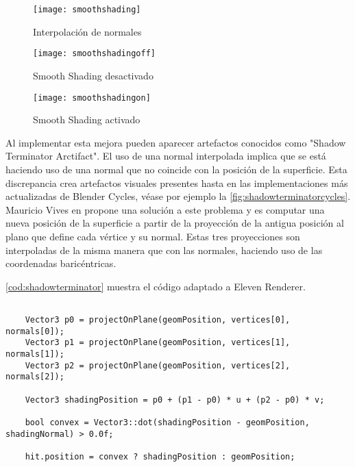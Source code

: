 \begin{figure}[H]
    \centering
	\texttt{[image: smoothshading]}
	\caption{Interpolación de normales}
	\label{fig:smoothshading}
\end{figure}

\begin{figure}[H]
		\centering
		\begin{minipage}[b]{0.4\textwidth}
		\texttt{[image: smoothshadingoff]}
		\caption{Smooth Shading desactivado}
		\label{fig:smoothshadingoff}
	  \end{minipage}
	  \hfill
	  \begin{minipage}[b]{0.4\textwidth}
		\texttt{[image: smoothshadingon]}
		\caption{Smooth Shading activado}
		\label{fig:smoothshadingon}
	  \end{minipage}
	  	\hfill
\end{figure}


Al implementar esta mejora pueden aparecer artefactos conocidos como "Shadow Terminator Arctifact". El uso de una normal interpolada implica que se está haciendo uso de una normal que no coincide con la posición de la superficie. Esta discrepancia crea artefactos visuales presentes hasta en las implementaciones más actualizadas de Blender Cycles, véase por ejemplo la \autoref{fig:shadowterminatorcycles}. Mauricio Vives en \cite{shadowterminatorrepo} propone una solución a este problema y es computar una nueva posición de la superficie a partir de la proyección de la antigua posición al plano que define cada vértice y su normal. Estas tres proyecciones son interpoladas de la misma manera que con las normales, haciendo uso de las coordenadas baricéntricas.
	
\autoref{cod:shadowterminator} muestra el código adaptado a Eleven Renderer.

\begin{minipage}[c]{0.95\textwidth}
\begin{lstlisting}[label={cod:shadowterminator}, caption={Código Shadow Terminator}]
	
	Vector3 p0 = projectOnPlane(geomPosition, vertices[0], normals[0]);
    Vector3 p1 = projectOnPlane(geomPosition, vertices[1], normals[1]);
    Vector3 p2 = projectOnPlane(geomPosition, vertices[2], normals[2]);

    Vector3 shadingPosition = p0 + (p1 - p0) * u + (p2 - p0) * v;

    bool convex = Vector3::dot(shadingPosition - geomPosition, shadingNormal) > 0.0f;
	
	hit.position = convex ? shadingPosition : geomPosition;
	
\end{lstlisting}
\end{minipage}


